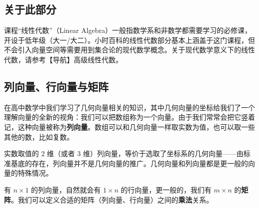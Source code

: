 
\begin{issues}
\issueDraft
\end{issues}

\subsection{关于此部分}

课程“线性代数”（Linear Algebra）一般指数学系和非数学都需要学习的必修课，开设于低年级（大一/大二）。小时百科的线性代数部分基本上涵盖于这门课程，但不会引入向量空间等需要用到集合论的现代数学概念。关于现代数学意义下的线性代数，请参考【导航】高级线性代数。



\subsection{列向量、行向量与矩阵}

在高中数学中我们学习了几何向量相关的知识，其中几何向量的坐标给我们了一个理解向量的全新的视角：我们可以把数组称为一个向量。由于我们常常会把它竖着记，这种向量被称为\textbf{列向量}。数组可以和几何向量一样取实数为值，也可以取一些其他的数，比如复数。


实数取值的 $2$ 维（或者 $3$ 维）列向量，等价于选取了坐标系的几何向量——由标准基底的存在，列向量并不是几何向量的推广。几何向量和列向量都是更一般的向量的特殊情况。


有 $n \times 1$ 的列向量，自然就会有 $1 \times n$ 的行向量，更一般的，我们有 $m \times n$ 的\textbf{矩阵}。我们可以定义合适的矩阵（列向量、行向量）之间的\textbf{乘法}关系。







